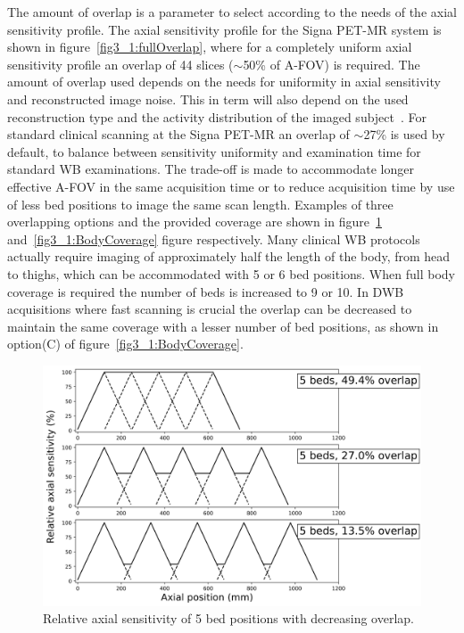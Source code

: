 %
The amount of overlap is a parameter to select according to the needs of the axial sensitivity profile.  The axial sensitivity profile for the Signa PET-MR system is shown in figure~\ref{fig3_1:fullOverlap}, where for a completely uniform axial sensitivity profile an overlap of 44 slices ($\sim$50\% of A-FOV) is required.
The amount of overlap used depends on the needs for uniformity in axial sensitivity and reconstructed image noise. This in term will also depend on the used reconstruction type and the activity distribution of the imaged subject~\cite{Schubert1996}. 
For standard clinical scanning at the Signa PET-MR an overlap of $\sim$27\% is used by default, to balance between sensitivity uniformity and examination time for standard WB examinations. The trade-off is made to accommodate longer effective A-FOV in the same acquisition time or to reduce acquisition time by use of less bed positions to image the same scan length. Examples of three overlapping options and the provided coverage are shown in figure~\ref{fig3_1:decreasingOverlap} and~\ref{fig3_1:BodyCoverage} figure respectively.
Many clinical WB protocols actually require imaging of approximately half the length of the body, from head to thighs, which can be accommodated with 5 or 6 bed positions. When full body coverage is required the number of beds is increased to 9 or 10. In DWB acquisitions where fast scanning is crucial the overlap can be decreased to maintain the same coverage with a lesser number of bed positions, as shown in option(C) of figure~\ref{fig3_1:BodyCoverage}. 
%
\begin{figure} [ht!]
\centering
\includegraphics[scale=0.5,angle=0]{3_Results/3_1_DWB_Optimization/figures/SensitivityProfiles_3Options.png}
\caption{Relative axial sensitivity of 5 bed positions with decreasing overlap.} 
\label{fig3_1:decreasingOverlap}
\end{figure}
